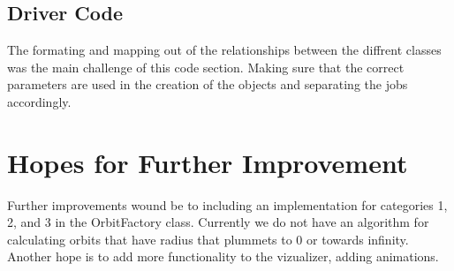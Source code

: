 \documentclass{article}
\begin{document}
\subsection{Driver Code}
The formating and mapping out of the relationships between the diffrent classes was the main challenge of this code section. Making sure that the correct parameters are used in the creation of the objects and separating the jobs accordingly.

\section{Hopes for Further Improvement}

Further improvements wound be to including an implementation for categories 1, 2, and 3 in the OrbitFactory class. Currently we do not have an algorithm for calculating orbits that have radius that plummets to 0 or towards infinity.\\
Another hope is to add more functionality to the vizualizer, adding animations.
\end{document}
